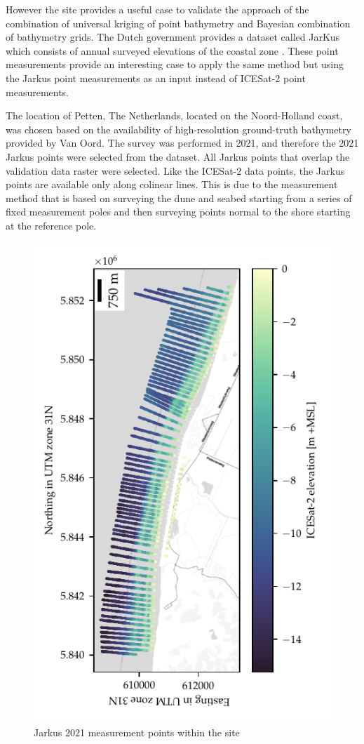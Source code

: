 However the site provides a useful case to validate the approach of the combination of universal kriging of point bathymetry and Bayesian combination of bathymetry grids. The Dutch government provides a dataset called JarKus which consists of annual surveyed elevations of the coastal zone \parencite{Minneboo1995}. These point measurements provide an interesting case to apply the same method but using the Jarkus point measurements as an input instead of ICESat-2 point measurements.

The location of Petten, The Netherlands, located on the Noord-Holland coast, was chosen based on the availability of high-resolution ground-truth bathymetry provided by Van Oord. The survey was performed in 2021, and therefore the 2021 Jarkus points were selected from the dataset. All Jarkus points that overlap the validation data raster were selected. Like the ICESat-2 data points, the Jarkus points are available only along colinear lines. This is due to the measurement method that is based on surveying the dune and seabed starting from a series of fixed measurement poles and then surveying points normal to the shore starting at the reference pole. 


\begin{figure}[h]
    \includegraphics[]{figures/Petten_photon_map.pdf}
    \caption{Jarkus 2021 measurement points within the site}
    \label{fig:jarkus-points}
\end{figure}

